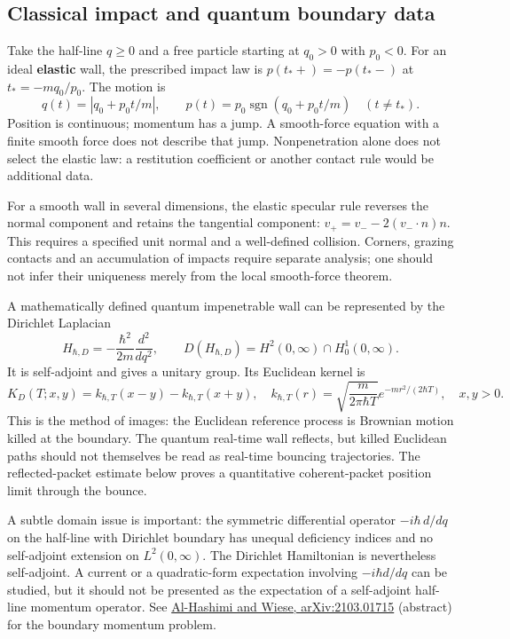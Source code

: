 \documentclass[11pt,a4paper]{article}
\begin{document}
\subsection{Classical impact and quantum boundary
data}\label{classical-impact-and-quantum-boundary-data}

Take the half-line \(q\ge0\) and a free particle starting at \(q_0>0\)
with \(p_0<0\). For an ideal \textbf{elastic} wall, the prescribed
impact law is \(p(t_*+)=-p(t_* -)\) at \(t_*=-mq_0/p_0\). The motion is
\[q(t)=|q_0+p_0t/m|,\qquad
 p(t)=p_0\operatorname{sgn}(q_0+p_0t/m)\quad(t\ne t_*).\] Position is
continuous; momentum has a jump. A smooth-force equation with a finite
smooth force does not describe that jump. Nonpenetration alone does not
select the elastic law: a restitution coefficient or another contact
rule would be additional data.

For a smooth wall in several dimensions, the elastic specular rule
reverses the normal component and retains the tangential component:
\(v_+=v_--2(v_-\cdot n)n\). This requires a specified unit normal and a
well-defined collision. Corners, grazing contacts and an accumulation of
impacts require separate analysis; one should not infer their uniqueness
merely from the local smooth-force theorem.

A mathematically defined quantum impenetrable wall can be represented by
the Dirichlet Laplacian
\[H_{\hbar,D}=-\frac{\hbar^2}{2m}\frac{d^2}{dq^2},
\qquad D(H_{\hbar,D})=H^2(0,\infty)\cap H^1_0(0,\infty).\] It is
self-adjoint and gives a unitary group. Its Euclidean kernel is \[
 K_D(T;x,y)=k_{\hbar,T}(x-y)-k_{\hbar,T}(x+y),
 \quad
 k_{\hbar,T}(r)=\sqrt{\frac m{2\pi\hbar T}}
             e^{-mr^2/(2\hbar T)},\quad x,y>0.
\] This is the method of images: the Euclidean reference process is
Brownian motion killed at the boundary. The quantum real-time wall
reflects, but killed Euclidean paths should not themselves be read as
real-time bouncing trajectories. The reflected-packet estimate below
proves a quantitative coherent-packet position limit through the bounce.

A subtle domain issue is important: the symmetric differential operator
\(-i\hbar\,d/dq\) on the half-line with Dirichlet boundary has unequal
deficiency indices and no self-adjoint extension on \(L^2(0,\infty)\).
The Dirichlet Hamiltonian is nevertheless self-adjoint. A current or a
quadratic-form expectation involving \(-i\hbar d/dq\) can be studied,
but it should not be presented as the expectation of a self-adjoint
half-line momentum operator. See
\href{https://arxiv.org/abs/2103.01715}{Al-Hashimi and Wiese,
arXiv:2103.01715} (abstract) for the boundary momentum problem.
\end{document}

